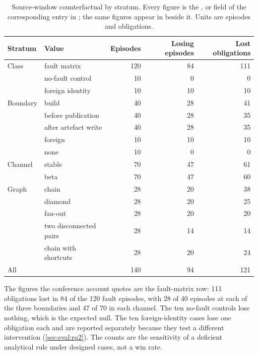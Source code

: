 \begin{table}[ht]
\centering\footnotesize
\caption{Source-window counterfactual by stratum. Every figure is the
,  or
 field of the corresponding
 entry in
\protect{}; the
same figures appear in \protect{} beside it. Units are episodes and
obligations.}
\label{tab:eval:counterfactual}
\begin{tabular}{@{}llrrr@{}}
\toprule
Stratum & Value & Episodes & Losing episodes & Lost obligations \\
\midrule
Class & fault matrix & 120 & 84 & 111 \\
      & no-fault control & 10 & 0 & 0 \\
      & foreign identity & 10 & 10 & 10 \\
\midrule
Boundary & build & 40 & 28 & 41 \\
         & before publication & 40 & 28 & 35 \\
         & after artefact write & 40 & 28 & 35 \\
         & foreign & 10 & 10 & 10 \\
         & none & 10 & 0 & 0 \\
\midrule
Channel & stable & 70 & 47 & 61 \\
        & beta & 70 & 47 & 60 \\
\midrule
Graph & chain & 28 & 20 & 38 \\
      & diamond & 28 & 20 & 25 \\
      & fan-out & 28 & 20 & 20 \\
      & two disconnected pairs & 28 & 14 & 14 \\
      & chain with shortcuts & 28 & 20 & 24 \\
\midrule
All & & 140 & 94 & 121 \\
\bottomrule
\end{tabular}
\end{table}

The figures the conference account quotes are the fault-matrix row: 111
obligations lost in 84 of the 120 fault episodes, with 28 of 40 episodes at
each of the three boundaries and 47 of 70 in each channel. The ten no-fault
controls lose nothing, which is the expected null. The ten foreign-identity
cases lose one obligation each and are reported separately because they test a
different intervention (\cref{sec:eval:rq2}). The counts are the sensitivity
of a deficient analytical rule under designed cases, not a win rate.

